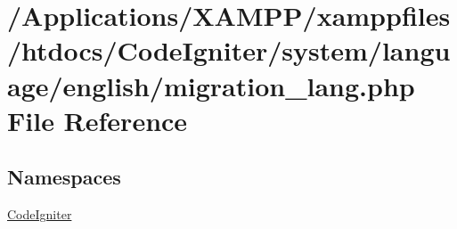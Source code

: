 \hypertarget{migration__lang_8php}{}\section{/\+Applications/\+X\+A\+M\+P\+P/xamppfiles/htdocs/\+Code\+Igniter/system/language/english/migration\+\_\+lang.php File Reference}
\label{migration__lang_8php}
\subsection*{Namespaces}
\begin{DoxyCompactItemize}
\item 
 \mbox{\hyperlink{namespace_code_igniter}{Code\+Igniter}}
\end{DoxyCompactItemize}
